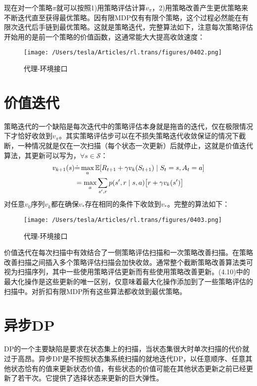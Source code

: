 \documentclass{ctexart}
\begin{document}
现在对一个策略$\pi$就可以按照1)用策略评估计算$v_\pi$，2)用策略改善产生更优策略来不断迭代直至获得最优策略。因有限MDP仅有有限个策略，这个过程必然能在有限次迭代后手链到最优策略。这就是策略迭代，完整算法如下，注意每次策略评估开始用的是前一个策略的价值函数，这通常能大大提高收敛速度：

\begin{figure}[htbp]
    \centering
    \texttt{[image: /Users/tesla/Articles/rl.trans/figures/0402.png]}
    \caption{代理-环境接口}
    \label{fig:0402} 
\end{figure}



\section{价值迭代}

策略迭代的一个缺陷是每次迭代中的策略评估本身就是拖沓的迭代，仅在极限情况下才恰好收敛到$v_\pi$。其实策略评估步可以在不损失策略迭代收敛保证的情况下截断，一种情况就是仅在一次扫描（每个状态一次更新）后就停止，这就是价值迭代算法，其更新可以写为，$\forall s \in \mathcal S$：
\begin{align}
v_{k+1}(s)
&\dot= \max_a \mathbb E[R_{t+1} + \gamma v_k(S_{t+1}) \mid S_t=s, A_t=a] \notag\\
&= \max_a \sum_{s',r} p(s',r \mid s,a)\bigl[ r+\gamma v_k(s') \bigr]
\end{align}
对任意$v_0$序列$v_k$都在确保$v_*$存在相同的条件下收敛到$v_*$。完整的算法如下：

\begin{figure}[htbp]
    \centering
    \texttt{[image: /Users/tesla/Articles/rl.trans/figures/0403.png]}
    \caption{代理-环境接口}
    \label{fig:0403} 
\end{figure}

价值迭代在每次扫描中有效结合了一侧策略评估扫描和一次策略改善扫描。在策略改善扫描之间插入多个策略评估扫描会加快收敛。通常整个截断策略改善算法类可视为扫描序列，其中一些使用策略评估更新而有些使用策略改善更新。(4.10)中的最大化操作是这些更新的唯一区别，仅意味着最大化操作添加到了一些策略评估的扫描中。对折扣有限MDP所有这些算法都收敛到最优策略。



\section{异步DP}

DP的一个主要缺陷是要求在状态集上的扫描，当状态集很大时单次扫描的代价就过于高昂。异步DP是不按照状态集系统扫描的就地迭代DP，以任意顺序、任意其他状态恰有的值来更新状态价值，有些状态的价值可能在其他状态更新之前已经更新了若干次。它提供了选择状态来更新的巨大弹性。
\end{document}
